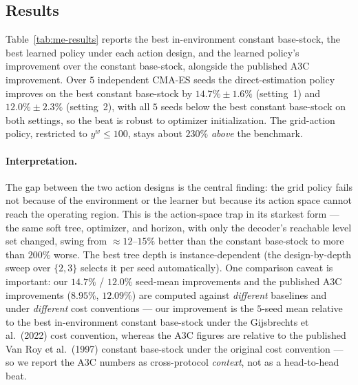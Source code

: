 \documentclass[11pt]{article}
\begin{document}
\subsection{Results}

Table~\ref{tab:me-results} reports the best in-environment constant base-stock, the best learned
policy under each action design, and the learned policy's improvement over the constant base-stock,
alongside the published A3C improvement. Over $5$ independent CMA-ES seeds the direct-estimation
policy improves on the best constant base-stock by $14.7\%\pm1.6\%$ (setting~1) and $12.0\%\pm2.3\%$
(setting~2), with all $5$ seeds below the best constant base-stock on both settings, so the beat is robust to optimizer
initialization. The grid-action policy, restricted to $y^w\le 100$, stays about $230\%$ \emph{above}
the benchmark.
\paragraph{Interpretation.}
The gap between the two action designs is the central finding: the grid policy fails not because of
the environment or the learner but because its action space cannot reach the operating region. This
is the action-space trap in its starkest form --- the same soft tree, optimizer, and horizon, with
only the decoder's reachable level set changed, swing from $\approx 12$--$15\%$ better than the constant
base-stock to more than $200\%$ worse. The best tree depth is instance-dependent (the design-by-depth
sweep over $\{2,3\}$ selects it per seed automatically). One comparison caveat is important: our
$14.7\%$ / $12.0\%$ seed-mean improvements and the published A3C improvements ($8.95\%$, $12.09\%$)
are computed against \emph{different} baselines and under \emph{different} cost conventions --- our
improvement is the $5$-seed mean relative to the best in-environment constant base-stock under the
Gijsbrechts et al.\ (2022) cost convention, whereas the A3C figures are relative to the published
Van Roy et al.\ (1997) constant base-stock under the original cost convention --- so we report the A3C
numbers as cross-protocol \emph{context}, not as a head-to-head beat.
\end{document}

